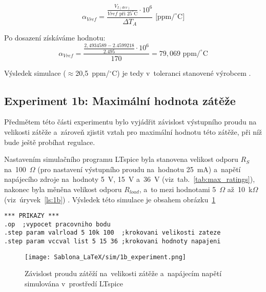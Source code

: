 \documentclass[12pt]{CLASS/protokol}
\begin{document}
        \begin{equation}\label{eq:TI_alpha}
            \alpha_{Vref}=\frac{\frac{V_{I(dev)}}{V{ref}\text{ při~25}^\circ\text{C}}\cdot10^6}{\Delta T_A}\text{ [ppm/}^\circ\text{C]}
        \end{equation}

        \par
        Po dosazení získáváme hodnotu:
        \begin{equation}
            \alpha_{Vref} = \frac{\frac{2,4934589-2.4599218}{2.495}\cdot10^6}{170}=79,069\text{ ppm/}^\circ\text{C}
        \end{equation}

        \par
        Výsledek simulace ($\approx$20,5~ppm/$^\circ$C) je tedy v~toleranci stanovené výrobcem \cite{TI_TL431_datasheet}.
        
    \newpage        
    \subsection{Experiment 1b: Maximální hodnota zátěže}\label{subsec:1b}
        Předmětem této části experimentu bylo vyjádřit závislost výstupního proudu na velikosti zátěže a~zároveň zjistit vztah pro maximální hodnotu této zátěže, při níž bude ještě probíhat regulace.
        \par
        Nastavením simulačního programu LTspice byla stanovena velikost odporu $R_S$ na~100~$\Omega$ (pro nastavení výstupního proudu na~hodnotu 25~mA) a~napětí napájecího zdroje na~hodnoty 5~V, 15~V a~36~V (viz~tab.~\ref{tab:max_ratings}), nakonec byla měněna velikost odporu $R_{load}$, a~to mezi hodnotami 5~$\Omega$ až~10~k$\Omega$ (viz~úryvek~\ref{ls:1b}) \cite{LTspice}. Výsledek této simulace je obsahem obrázku~\ref{fig:1b}

        \begin{lstlisting}[label=ls:1b,caption=Příkazy využity v~experimentu~1b]
*** PRIKAZY ***
.op  ;vypocet pracovniho bodu
.step param valrload 5 10k 100  ;krokovani velikosti zateze
.step param vccval list 5 15 36 ;krokovani hodnoty napajeni
        \end{lstlisting}
        
        \begin{figure}[h]
            \centering
            \texttt{[image: Sablona\_LaTeX/sim/1b\_experiment.png]}
            \caption{Závislost proudu zátěží na~velikosti zátěže a~napájecím napětí simulována v~prostředí LTspice \cite{LTspice}}
            \label{fig:1b}
        \end{figure}
    
\end{document}
